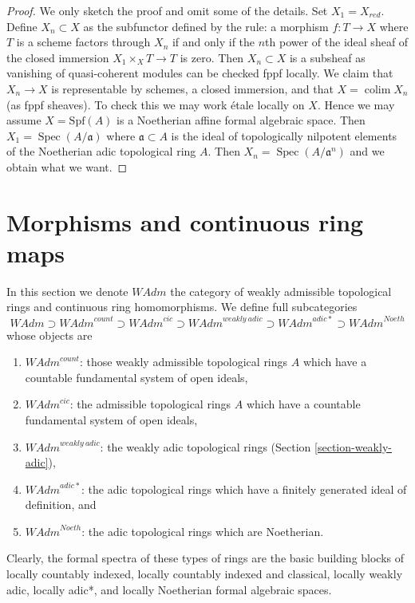 \documentclass{stacks-project}
\theoremstyle{plain}
\theoremstyle{definition}
\theoremstyle{remark}
\numberwithin{equation}{subsection}
\def\colim{\mathop{\mathrm{colim}}\nolimits}
\def\Spec{\mathop{\mathrm{Spec}}}
\begin{document}
\begin{proof}
We only sketch the proof and omit some of the details.
Set $X_1 = X_{red}$. Define $X_n \subset X$ as the subfunctor
defined by the rule: a morphism $f : T \to X$ where $T$ is a scheme factors
through $X_n$ if and only if the $n$th power of the ideal sheaf
of the closed immersion $X_1 \times_X T \to T$ is zero. Then $X_n \subset X$
is a subsheaf as vanishing of quasi-coherent modules can be checked
fppf locally. We claim that $X_n \to X$ is representable by schemes,
a closed immersion, and that $X = \colim X_n$ (as fppf sheaves).
To check this we may work \'etale locally on $X$. Hence we may assume
$X = \text{Spf}(A)$ is a Noetherian affine formal algebraic space.
Then $X_1 = \Spec(A/\mathfrak a)$ where $\mathfrak a \subset A$
is the ideal of topologically nilpotent elements of the Noetherian
adic topological ring $A$. Then $X_n = \Spec(A/\mathfrak a^n)$
and we obtain what we want.
\end{proof}









\section{Morphisms and continuous ring maps}
\label{section-morphisms-rings}

\noindent
In this section we denote $\textit{WAdm}$ the category of
weakly admissible topological rings and continuous ring homomorphisms.
We define full subcategories
$$
\textit{WAdm} \supset
\textit{WAdm}^{count} \supset
\textit{WAdm}^{cic} \supset
\textit{WAdm}^{weakly\ adic} \supset
\textit{WAdm}^{adic*} \supset
\textit{WAdm}^{Noeth}
$$
whose objects are
\begin{enumerate}
\item $\textit{WAdm}^{count}$: those weakly admissible topological rings
$A$ which have a countable fundamental system of open ideals,
\item $\textit{WAdm}^{cic}$: the admissible topological rings
$A$ which have a countable fundamental system of open ideals,
\item $\textit{WAdm}^{weakly\ adic}$: the weakly adic topological rings
(Section \ref{section-weakly-adic}),
\item $\textit{WAdm}^{adic*}$: the adic topological rings which have
a finitely generated ideal of definition, and
\item $\textit{WAdm}^{Noeth}$: the adic topological rings which
are Noetherian.
\end{enumerate}
Clearly, the formal spectra of these types of rings are the basic
building blocks of
locally countably indexed,
locally countably indexed and classical,
locally weakly adic,
locally adic*, and
locally Noetherian formal algebraic spaces.
\end{document}
